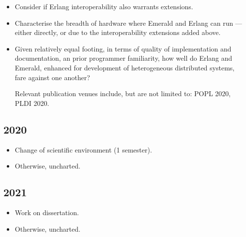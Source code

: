 \begin{itemize}

\item Consider if Erlang interoperability also warrants extensions.

\item Characterise the breadth of hardware where Emerald and Erlang
can run --- either directly, or due to the interoperability extensions
added above.

\item Given relatively equal footing, in terms of quality of
implementation and documentation, an prior programmer familiarity, how
well do Erlang and Emerald, enhanced for development of heterogeneous
distributed systems, fare against one another?

\noindent Relevant publication venues include, but are not limited to:
POPL 2020, PLDI 2020.

\end{itemize}

\subsection*{2020}

\begin{itemize}

\item Change of scientific environment (1 semester).

\item Otherwise, uncharted.

\end{itemize}

\subsection*{2021}

\begin{itemize}

\item Work on dissertation.

\item Otherwise, uncharted.

\end{itemize}
